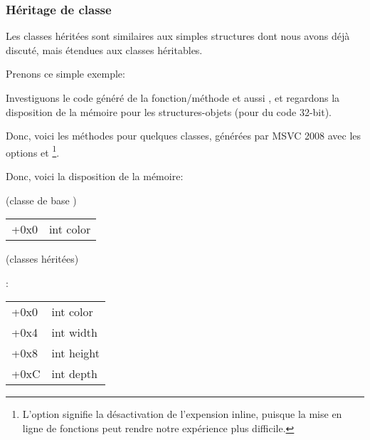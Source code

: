 \subsubsection{Héritage de classe}
\label{cpp_inheritance}


Les classes héritées sont similaires aux simples structures dont nous avons déjà
discuté, mais étendues aux classes héritables.

Prenons ce simple exemple:




Investiguons le code généré de la fonction/méthode  et aussi ,
et regardons la disposition de la mémoire pour les structures-objets (pour du code
32-bit).


Donc, voici les méthodes  pour quelques classes, générées par
MSVC 2008 avec les options \Ox et \Obzero
\footnote{L'option \Obzero signifie la désactivation de l'expension inline, puisque
la mise en ligne de fonctions peut rendre notre expérience plus difficile.}.







Donc, voici la disposition de la mémoire:

(classe de base )

\begin{center}
\begin{tabular}{ | l | l | }
\hline
  \tableheader{} \\
\hline
  +0x0 & int color \\
\hline
\end{tabular}
\end{center}

(classes héritées)

:

\begin{center}
\begin{tabular}{ | l | l | }
\hline
  \tableheader{} \\
\hline
  +0x0 & int color \\
\hline
  +0x4 & int width \\
\hline
  +0x8 & int height \\
\hline
  +0xC & int depth \\
\hline
\end{tabular}
\end{center}

